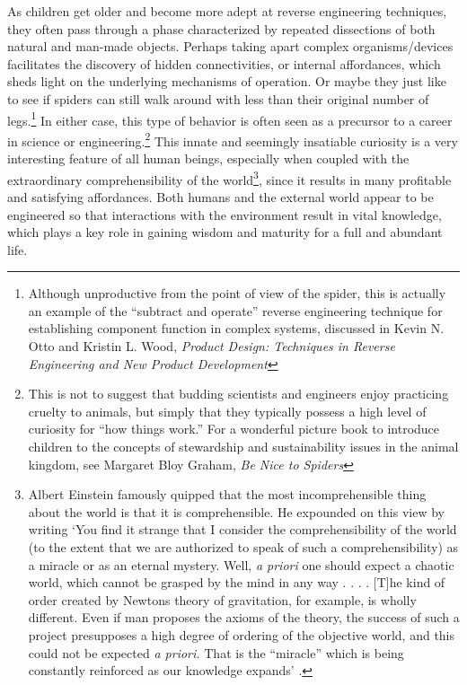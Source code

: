 As children get older and become more adept at reverse engineering
techniques, they often pass through a phase characterized by repeated
dissections of both natural and man-made objects. Perhaps taking apart
complex organisms/devices facilitates the discovery of hidden
connectivities, or internal affordances, which sheds light on the
underlying mechanisms of operation. Or maybe they just like to see if
spiders can still walk around with less than their original number of
legs.\footnote{Although unproductive from the point of view of the
spider, this is actually an example of the “subtract and operate”
reverse engineering technique for establishing component function in
complex systems, discussed in Kevin N. Otto and Kristin L. Wood,
\textit{Product Design: Techniques in Reverse Engineering and New Product Development}\citep[][pgs. 159--162, 204--211]{ottowood2001}}
In either case, this type of behavior is often
seen as a precursor to a career in science or
engineering.\footnote{
This is not to suggest that budding scientists and
engineers enjoy practicing cruelty to animals, but simply that they
typically possess a high level of curiosity for “how things work.” For
a wonderful picture book to introduce children to the concepts of
stewardship and sustainability issues in the animal kingdom, see
Margaret Bloy Graham, \textit{Be Nice to Spiders}\citep{graham1967} 
}
This innate and seemingly insatiable
curiosity is a very interesting feature of all human beings, especially
when coupled with the extraordinary comprehensibility of the
world\footnote{
Albert Einstein famously quipped that the most
incomprehensible thing about the world is that it is comprehensible. He
expounded on this view by writing ‘You find it strange that I consider
the comprehensibility of the world (to the extent that we are
authorized to speak of such a comprehensibility) as a miracle or as an
eternal mystery. Well, \textit{a priori} one should expect a chaotic
world, which cannot be grasped by the mind in any way . . . . [T]he
kind of order created by Newton{\textquotesingle}s theory of
gravitation, for example, is wholly different. Even if man proposes the
axioms of the theory, the success of such a project presupposes a high
degree of ordering of the objective world, and this could not be
expected \textit{a priori.} That is the
``miracle'' which is being constantly
reinforced as our knowledge expands’ \citep[][pg. 131]{einstein1987}.
}, since it results in many profitable and
satisfying affordances. Both humans and the external world appear to be
engineered so that interactions with the environment result in vital
knowledge, which plays a key role in gaining wisdom and maturity for a
full and abundant life.  %

